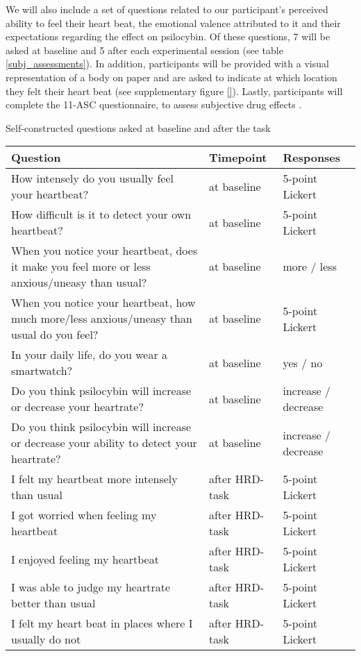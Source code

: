 \documentclass{article}
\begin{document}

We will also include a set of questions related to our participant's perceived ability to feel their heart beat, the emotional valence attributed to it and their expectations regarding the effect on psilocybin. Of these questions, 7 will be asked at baseline and 5 after each experimental session (see table \ref{subj_assessments}). In addition, participants will be provided with a visual representation of a body on paper and are asked to indicate at which location they felt their heart beat (see supplementary figure \ref{}). Lastly, participants will complete the 11-ASC questionnaire, to assess subjective drug effects \parencite{studerus2010psychometric}.

\begin{center}
\scriptsize
\label{subj_assessments}
\caption{Self-constructed questions asked at baseline and after the task}
\begin{tabular}{ | m{} | m{}| m{} | } 
 \hline
 Question & Timepoint & Responses \\ 
 \hline\hline
 How intensely do you usually feel your heartbeat? & at baseline & 5-point Lickert \\\hline
 How difficult is it to detect your own heartbeat? & at baseline & 5-point Lickert \\\hline
 When you notice your heartbeat, does it make you feel more or less anxious/uneasy than usual? & at baseline & more / less \\\hline
 When you notice your heartbeat, how much more/less anxious/uneasy than usual do you feel? & at baseline & 5-point Lickert \\\hline
 In your daily life, do you wear a smartwatch? & at baseline & yes / no \\\hline
 Do you think psilocybin will increase or decrease your heartrate? & at baseline & increase / decrease \\\hline
 Do you think psilocybin will increase or decrease your ability to detect your heartrate? & at baseline & increase / decrease \\\hline
 I felt my heartbeat more intensely than usual & after HRD-task & 5-point Lickert \\  \hline
 I got worried when feeling my heartbeat & after HRD-task & 5-point Lickert \\\hline
 I enjoyed feeling my heartbeat & after HRD-task & 5-point Lickert \\\hline
 I was able to judge my heartrate better than usual & after HRD-task & 5-point Lickert \\\hline
 I felt my heart beat in places where I usually do not & after HRD-task & 5-point Lickert \\
 \hline
\end{tabular}
\end{center}
\end{document}
